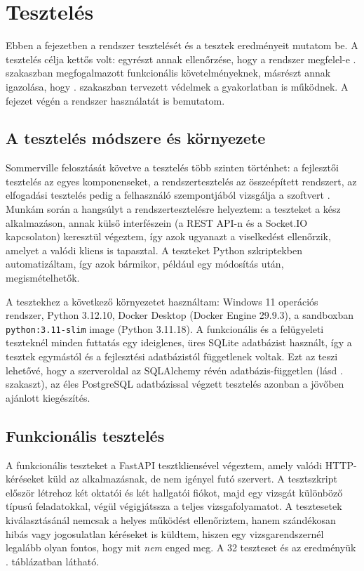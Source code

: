 \chapter{Tesztelés}
\label{ch:teszteles}

Ebben a fejezetben a rendszer tesztelését és a tesztek eredményeit mutatom be. A tesztelés célja
kettős volt: egyrészt annak ellenőrzése, hogy a rendszer megfelel-e .
szakaszban megfogalmazott funkcionális követelményeknek, másrészt annak igazolása, hogy
. szakaszban tervezett védelmek a gyakorlatban is működnek. A fejezet
végén a rendszer használatát is bemutatom.

\section{A tesztelés módszere és környezete}

Sommerville felosztását követve a tesztelés több szinten történhet: a fejlesztői tesztelés az
egyes komponenseket, a rendszertesztelés az összeépített rendszert, az elfogadási tesztelés
pedig a felhasználó szempontjából vizsgálja a szoftvert \cite{sommerville2016software}. Munkám
során a hangsúlyt a rendszertesztelésre helyeztem: a teszteket a kész alkalmazáson, annak
külső interfészein (a REST API-n és a Socket.IO kapcsolaton) keresztül végeztem, így azok
ugyanazt a viselkedést ellenőrzik, amelyet a valódi kliens is tapasztal. A teszteket Python
szkriptekben automatizáltam, így azok bármikor, például egy módosítás után, megismételhetők.

A tesztekhez a következő környezetet használtam: Windows 11 operációs rendszer, Python 3.12.10,
Docker Desktop (Docker Engine 29.9.3), a sandboxban \texttt{python:3.11-slim} image (Python
3.11.18). A funkcionális és a felügyeleti teszteknél minden futtatás egy ideiglenes, üres SQLite
adatbázist használt, így a tesztek egymástól és a fejlesztési adatbázistól függetlenek voltak. Ezt
az teszi lehetővé, hogy a szerveroldal az SQLAlchemy révén adatbázis-független (lásd
. szakaszt), az éles PostgreSQL adatbázissal végzett tesztelés azonban a
jövőben ajánlott kiegészítés.

\section{Funkcionális tesztelés}
\label{sec:funkcionalis_teszt}

A funkcionális teszteket a FastAPI tesztkliensével végeztem, amely valódi HTTP-kéréseket küld az
alkalmazásnak, de nem igényel futó szervert. A tesztszkript először létrehoz két oktatói és két
hallgatói fiókot, majd egy vizsgát különböző típusú feladatokkal, végül végigjátssza a teljes
vizsgafolyamatot. A tesztesetek kiválasztásánál nemcsak a helyes működést ellenőriztem, hanem
szándékosan hibás vagy jogosulatlan kéréseket is küldtem, hiszen egy vizsgarendszernél legalább
olyan fontos, hogy mit \textit{nem} enged meg. A 32 teszteset és az eredményük
. táblázatban látható.

